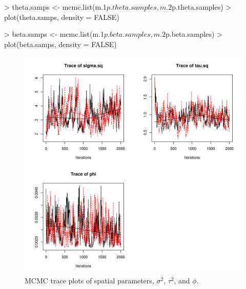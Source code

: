 \documentclass{article}
\begin{document}
\begin{Schunk}
\begin{Sinput}
> theta.samps <- mcmc.list(m.1$p.theta.samples, m.2$p.theta.samples)
> plot(theta.samps, density = FALSE)
\end{Sinput}
\end{Schunk}

\begin{Schunk}
\begin{Sinput}
> beta.samps <- mcmc.list(m.1$p.beta.samples, m.2$p.beta.samples)
> plot(beta.samps, density = FALSE)
\end{Sinput}
\end{Schunk}

\begin{figure}
\begin{center}
\includegraphics[width=12cm]{figures/fig-thetaSamples}
\end{center}
\caption{MCMC trace plots of spatial parameters, $\sigma^2$, $\tau^2$, and $\phi$.}
\label{fig:thetaSamples}
\end{figure}
\end{document}
